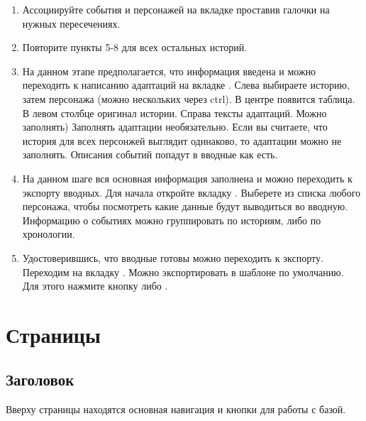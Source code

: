 \documentclass[a4paper,oneside,10pt,russian]{sphinxmanual}
\begin{document}
\begin{enumerate}
\item {}
Ассоциируйте события и персонажей на вкладке {\hyperref[pages:story-presence]{\emph{}}} проставив галочки на нужных пересечениях.

\item {}
Повторите пункты 5-8 для всех остальных историй.

\item {}
На данном этапе предполагается, что информация введена и можно переходить к написанию адаптаций на вкладке {\hyperref[pages:events-desc]{\emph{}}}. Слева выбираете историю, затем персонажа (можно нескольких через ctrl). В центре появится таблица. В левом столбце оригинал истории. Справа тексты адаптаций. Можно заполнять) Заполнять адаптации необязательно. Если вы считаете, что история для всех персонжей выглядит одинаково, то адаптации можно не заполнять. Описания событий попадут в вводные как есть.

\item {}
На данном шаге вся основная информация заполнена и можно переходить к экспорту вводных. Для начала откройте вкладку {\hyperref[pages:breifings-preview]{\emph{}}}. Выберете из списка любого персонажа, чтобы посмотреть какие данные будут выводиться во вводную. Информацию о событиях можно группировать по историям, либо по хронологии.

\item {}
Удостоверившись, что вводные готовы можно переходить к экспорту. Переходим на вкладку {\hyperref[pages:breifings-export]{\emph{}}}. Можно экспортировать в шаблоне по умолчанию. Для этого нажмите кнопку  либо .

\end{enumerate}


\chapter{Страницы}
\label{pages::doc}\label{pages:id1}

\section{Заголовок}
\label{pages:header-desc}\label{pages:id2}
Вверху страницы находятся основная навигация и кнопки для работы с базой.
\end{document}
